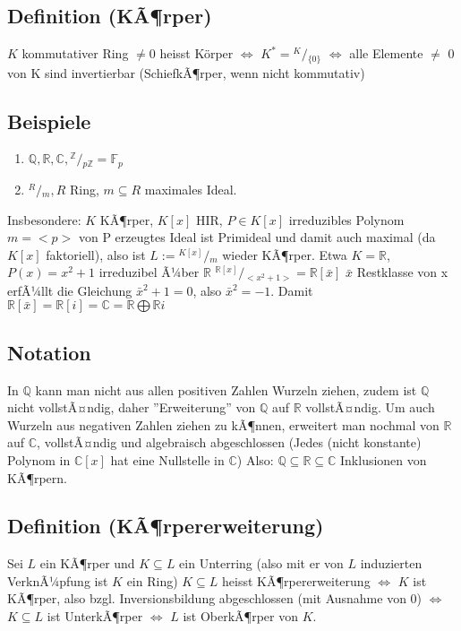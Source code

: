 \documentclass[12pt,a4paper,ngerman]{scrreprt}
\newcommand{\modulus}[2]{{}^{#1} \!/\!_{#2}}
\begin{document}
\subsection{Definition (KÃ¶rper)}
$K$ kommutativer Ring $\neq 0$ heisst Körper $\Leftrightarrow$ $K^* = \modulus{K}{\{0\}}$ 
$\Leftrightarrow$ alle Elemente $\neq$ 0 von K sind invertierbar
(SchiefkÃ¶rper, wenn nicht kommutativ)
\subsection{Beispiele}
\begin{enumerate}[]
\item $\mathbb{Q}, \mathbb{R}, \mathbb{C}, \modulus{\mathbb{Z}}{p\mathbb{Z}} = \mathbb{F}_p$
\item $\modulus{R}{m}, R$ Ring, $m \subseteq R$ maximales Ideal.
\end{enumerate}

Insbesondere: $K$ KÃ¶rper, $K[x]$ HIR, $P \in K[x]$ irreduzibles Polynom $m = <p>$
von P erzeugtes Ideal ist Primideal und damit auch maximal (da $K[x]$ faktoriell),
also ist $L := \modulus{K[x]}{m}$ wieder KÃ¶rper. 
Etwa $K = \mathbb{R}$, $P(x) = x^2 + 1$ irreduzibel Ã¼ber $\mathbb{R}$
$\modulus{\mathbb{R}[x]}{<x^2 + 1>} = \mathbb{R}[\bar{x}]$
$\bar{x}$ Restklasse von x erfÃ¼llt die Gleichung $\bar{x}^2 + 1 = 0$, also $\bar{x}^2 = -1$.
Damit $\mathbb{R}[\bar{x}] = \mathbb{R}[i] = \mathbb{C} = \mathbb{R} \bigoplus \mathbb{R}i$

\subsection{Notation}

In $\mathbb{Q}$ kann man nicht aus allen positiven Zahlen Wurzeln ziehen,
zudem ist $\mathbb{Q}$ nicht vollstÃ¤ndig, 
daher ''Erweiterung'' von $\mathbb{Q}$ auf $\mathbb{R}$ vollstÃ¤ndig.
Um auch Wurzeln aus negativen Zahlen ziehen zu kÃ¶nnen, erweitert man nochmal von
$\mathbb{R}$ auf $\mathbb{C}$, vollstÃ¤ndig und algebraisch abgeschlossen 
(Jedes (nicht konstante) Polynom in $\mathbb{C}[x]$ hat eine Nullstelle in $\mathbb{C}$)
Also: $\mathbb{Q} \subseteq \mathbb{R} \subseteq \mathbb{C}$ Inklusionen von KÃ¶rpern.

\subsection{Definition (KÃ¶rpererweiterung)}
Sei $L$ ein KÃ¶rper und $K \subseteq L$ ein Unterring 
(also mit er von $L$ induzierten VerknÃ¼pfung ist $K$ ein Ring)
$K \subseteq L$ heisst KÃ¶rpererweiterung $\Leftrightarrow$ 
$K$ ist KÃ¶rper, also bzgl. Inversionsbildung abgeschlossen (mit Ausnahme von 0)
$\Leftrightarrow$ $K \subseteq L$ ist UnterkÃ¶rper $\Leftrightarrow$ $L$ ist OberkÃ¶rper von $K$.
\end{document}
